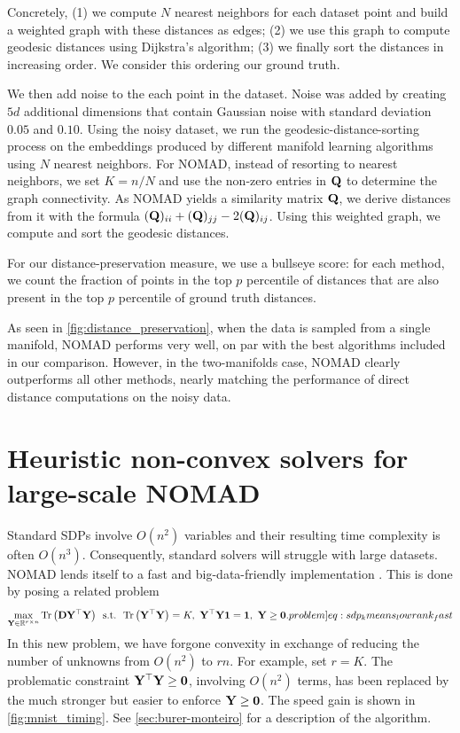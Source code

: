 \documentclass[twoside,11pt]{article}
\begin{document}
Concretely, (1) we compute $N$ nearest neighbors for each dataset point and build a weighted graph with these distances as edges; (2) we use this graph to compute geodesic distances using Dijkstra's algorithm; (3) we finally sort the distances in increasing order. We consider this ordering our ground truth.

We then add noise to the each point in the dataset. Noise was added by creating $5d$ additional dimensions that contain Gaussian noise with standard deviation $0.05$ and $0.10$.
Using the noisy dataset, we run the geodesic-distance-sorting process on the embeddings produced by different manifold learning algorithms using $N$ nearest neighbors. For NOMAD, instead of resorting to nearest neighbors, we set $K=n/N$ and use the non-zero entries in ${\mathbf{Q}}$ to determine the graph connectivity. As NOMAD yields a similarity matrix ${\mathbf{Q}}$, we derive distances from it with the formula $({\mathbf{Q}})_{ii} + ({\mathbf{Q}})_{jj} - 2 ({\mathbf{Q}})_{ij}$. Using this weighted graph, we compute and sort the geodesic distances.

For our distance-preservation measure, we use a bullseye score: for each method, we count  the fraction of points in the top $p$ percentile of distances that are also present in the top $p$ percentile of ground truth distances.

As seen in \cref{fig:distance_preservation}, when the data is sampled from a single manifold, NOMAD performs very well, on par with the best algorithms included in our comparison. However, in the two-manifolds case, NOMAD clearly outperforms all other methods, nearly matching the performance of direct distance computations on the noisy data.


\section{Heuristic non-convex solvers for large-scale NOMAD}
\label{sec:BM}

Standard SDPs involve $O(n^2)$ variables and their resulting time complexity is often $O(n^3)$. Consequently, standard solvers \citep{ODonoghue2016} will struggle with large datasets.
NOMAD lends itself to a fast and big-data-friendly implementation \citep{Kulis2007}. This is done by posing a related problem
\begin{equation}
	\max_{\mat{Y} \in \Real^{r \times n}}
	\traceone{\mat{D} \transpose{\mat{Y}} \mat{Y}}
	\enskip\text{s.t.}\enskip
	\traceone{\transpose{\mat{Y}} \mat{Y}} = K ,\
	\transpose{\mat{Y}} \mat{Y} \vect{1} = \vect{1} ,\
	\mat{Y} \geq \mat{0} .
	\label[problem]{eq:sdp_kmeans_lowrank_fast}
\end{equation}
In this new problem, we have forgone convexity in exchange of reducing the number of unknowns from $O(n^2)$ to $rn$. For example, \citet{Kulis2007} set $r = K$.
The problematic constraint ${\mathbf{{{\mathbf{Y}}}^\top {\mathbf{Y}}}} \geq {\mathbf{0}}$, involving $O(n^2)$ terms, has been replaced by the much stronger but easier to enforce ${\mathbf{Y}} \geq {\mathbf{0}}$. 
The speed gain is shown in \cref{fig:mnist_timing}. See \cref{sec:burer-monteiro} for a description of the algorithm.
\end{document}
